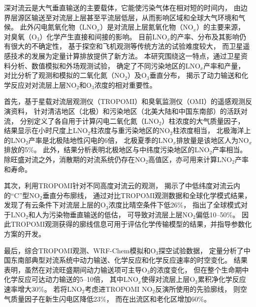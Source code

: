 
\abstract
{
深对流云是大气垂直输送的主要载体，它能使污染气体在相对短的时间内，
由边界层源区输送至对流层上层甚至平流层低层，从而影响区域和全球大气环境和气候。
此外闪电氮氧化物（LNO$_x$）是对流层上层氮氧化物（NO$_x$）的主要来源，
对臭氧（O$_3$）化学产生直接和间接的影响。
目前LNO$_x$的产率、分布及其影响仍有很大的不确定性，
基于探空和飞机观测等传统方法的试验难度较大，
而卫星遥感技术的发展为定量计算排放提供了新方法。
本研究围绕这一特点，通过卫星资料分析、数值模拟和外场观测试验，
确定了不同污染地区的LNO$_x$产率和产量，
对比分析了观测和模拟的二氧化氮（NO$_2$）及O$_3$垂直分布，
揭示了动力输送和化学反应对对流层上层NO$_2$和O$_3$浓度的相对重要性。

首先，基于星载对流层观测仪（TROPOMI）和臭氧监测仪（OMI）的遥感观测反演资料，
针对清洁地区（北极）和污染地区（北美大陆和中国东南部）的活跃对流，
分别定义了各自用于计算闪电二氧化氮（LNO$_2$）柱浓度的大气质量因子，
结果显示在小时尺度上LNO$_2$柱浓度与重污染地区的NO$_2$柱浓度相当，
北极海洋上的LNO$_2$产率是北极陆地性闪电的6倍，
北极夏季的LNO$_x$排放量是该地区人为NO$_x$排放的5\%。
此外，结果分析表明北极地区与中纬度污染地区的LNO$_2$产率相当。
除旺盛对流之外，消散期的对流系统仍存在NO$_2$高值区，亦可用来计算LNO$_2$产率和寿命。

其次，利用TROPOMI针对不同高度对流云的观测，
揭示了中低纬度对流云内的“C”型NO$_2$垂直分布廓线，
通过对比TROPOMI观测数据和全球化学模式结果，
发现了有云条件下对流层上层的O$_3$浓度比晴空条件下低26\%，
指出了全球模式对于LNO$_2$和人为污染物垂直输送的低估，
可导致对流层上层NO$_2$偏低10--50\%。
因此TROPOMI观测获得的廓线信息可用于评估化学传输模型的结果，并指导参数化方案的开发。

最后，综合TROPOMI观测、WRF-Chem模拟和O$_3$探空试验数据，
定量分析了中国东南部典型对流系统中动力输送、化学反应和化学反应速率的时空变化。
结果表明，虽然在对流旺盛期间动力输送项可主导O$_3$的浓度变化，
但在整个生命期中化学反应可达动力输送的5--10倍，
其中LNO$_x$使得对流层上层O$_3$累积净化学反应速率增大30\%。
若将LNO$_2$考虑进TROPOMI NO$_2$反演所使用的先验廓线，
则空气质量因子在新生闪电区降低23\%，
而在出流区和老化区增加60\%。
}
